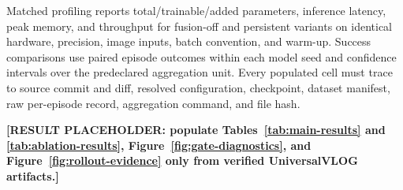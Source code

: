 Matched profiling reports total/trainable/added parameters, inference latency,
peak memory, and throughput for fusion-off and persistent variants on identical
hardware, precision, image inputs, batch convention, and warm-up.  Success
comparisons use paired episode outcomes within each model seed and confidence
intervals over the predeclared aggregation unit.  Every populated cell must
trace to source commit and diff, resolved configuration, checkpoint, dataset
manifest, raw per-episode record, aggregation command, and file hash.

\textbf{[RESULT PLACEHOLDER: populate Tables~\ref{tab:main-results} and
\ref{tab:ablation-results}, Figure~\ref{fig:gate-diagnostics}, and
Figure~\ref{fig:rollout-evidence} only from verified UniversalVLOG artifacts.]}
